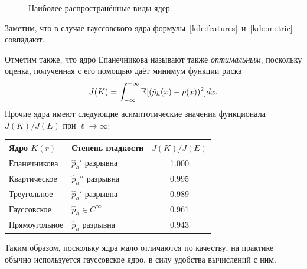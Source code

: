{\begin{figure}[h]
\caption{Наиболее распространённые виды ядер.}\label{kde:kernels}
\end{figure}

Заметим, что в случае гауссовского ядра
формулы~\eqref{kde:features}~и~\eqref{kde:metric} совпадают.

Отметим также, что ядро Епанечникова называют также \emph{оптимальным},
поскольку оценка, полученная с его помощью даёт минимум функции риска
\[
J(K) = \int_{-\infty}^{+\infty} \mathbb{E}[ (\hat{p}_h(x) - p(x))^2 ] dx.
\]
Прочие ядра имеют следующие асимптотические значения функционала $J(K)/J(E)$ при
$\ell \to \infty$:
\begin{center}
\begin{tabular}{|l|l|c|}
\hline
\textbf{Ядро} $K(r)$ & \textbf{Степень гладкости} & $J(K)/J(E)$ \\
\hline
Епанечникова & $\hat{p}_h'$ разрывна & 1.000\\
Квартическое & $\hat{p}_h''$ разрывна & 0.995\\
Треугольное & $\hat{p}_h'$ разрывна & 0.989\\
Гауссовское & $\hat{p}_h\in C^\infty$ & 0.961\\
Прямоугольное & $\hat{p}_h$ разрывна & 0.943\\
\hline
\end{tabular}
\end{center}
Таким образом, поскольку ядра мало отличаются по качеству, на практике обычно
используется гауссовское ядро, в силу удобства вычислений с ним.

}
